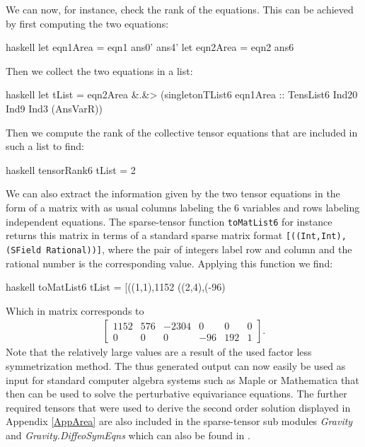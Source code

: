 \documentclass[a4paper,12pt, DIV=14, BCOR=5mm, twoside, headsepline, numbers=noenddot]{scrbook}
\begin{document}
We can now, for instance, check the rank of the equations. This can be achieved by first computing the two equations:
\begin{center}
\begin{cminted}{haskell}
let eqn1Area = eqn1 ans0' ans4' 
let eqn2Area = eqn2 ans6  
\end{cminted}
\end{center}
Then we collect the two equations in a list:
\begin{center}
\begin{cminted}{haskell}
let tList = eqn2Area &.&> (singletonTList6 eqn1Area ::
            TensList6 Ind20 Ind9 Ind3 (AnsVarR)) 
\end{cminted}
\end{center}
Then we compute the rank of the collective tensor equations that are included in such a list to find:
\begin{center}
\begin{cminted}{haskell}
tensorRank6 tList = 2 
\end{cminted}
\end{center}
We can also extract the information given by the two tensor equations in the form of a matrix with as usual columns labeling the 6 variables and rows labeling independent equations. The sparse-tensor function \texttt{toMatList6} for instance returns this matrix in terms of a standard sparse matrix format \texttt{[((Int,Int),(SField Rational))]}, where the pair of integers label row and column and the rational number is the corresponding value. Applying this function we find:
\begin{center}
\begin{cminted}{haskell}
toMatList6 tList = [((1,1),1152 %
                   ((2,4),(-96) %
\end{cminted}
\end{center}
Which in matrix corresponds to 
\begin{align}
    \begin{bmatrix}
    1152 & 576 & -2304 & 0 & 0 & 0 \\
    0 & 0 & 0 & -96 & 192 & 1
    \end{bmatrix}.
\end{align}
Note that the relatively large values are a result of the used factor less symmetrization method. The thus generated output can now easily be used as input for standard computer algebra systems such as Maple or Mathematica that then can be used to solve the perturbative equivariance equations.
The further required tensors that were used to derive the second order solution displayed in Appendix \ref{AppArea}
are also included in the sparse-tensor sub modules \textit{Gravity} and \textit{Gravity.DiffeoSymEqns} which can also be found in \cite{sparse-tensor}. 
\end{document}
